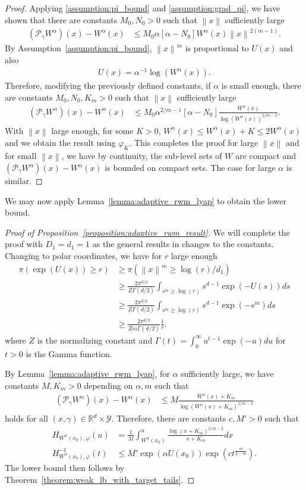 \documentclass[12pt]{article}
\theoremstyle{plain}
\theoremstyle{remark}
\newcommand{\norm}[1]{\left\lVert#1\right\rVert}
\newcommand{\R}{\mathbb{R}}
\renewcommand{\P}{\mathcal{P}}
\newcommand{\Y}{\mathcal{Y}}
\let\temp\phi
\let\phi\varphi
\let\varphi\temp
\newcommand{\eq}[1]{\begin{align*}#1\end{align*}}
\begin{document}
\begin{proof}
Applying \eqref{assumption:pi_bound} and \eqref{assumption:grad_pi}, we have shown that there are constants $M_0, N_0 > 0$ such that $\norm{x}$ sufficiently large
\begin{align*}
(\P_\gamma W^\alpha)(x) - W^\alpha(x)
&\le M_0 \alpha \left[ \alpha -  N_0 \right] W^\alpha(x) \norm{x}^{2(m-1)}.
\end{align*}
By Assumption~\ref{assumption:pi_bound}, $\norm{x}^m$ is proportional to $U(x)$ and also
\begin{align*}
U(x) = \alpha^{-1} \log(W^\alpha(x)).
\end{align*}
Therefore, modifying the previously defined constants, if $\alpha$ is small enough, there are constants $M_0, N_0, K_m > 0$ such that $\norm{x}$ sufficiently large
\begin{align*}
(\P_\gamma W^\alpha)(x) - W^\alpha(x)
&\le M_0 \alpha^{ 2/m - 1 } \left[ \alpha - N_0 \right] \frac{W^\alpha(x)}{ \log(W^\alpha(x))^{ 2/m - 2 } }.
\end{align*}
With $\norm{x}$ large enough, for some $K > 0$, $W^\alpha(x) \le W^\alpha(x) + K \le 2 W^\alpha(x)$ and we obtain the result using $\phi_K$.
This completes the proof for large $\norm{x}$ and for small $\norm{x}$, we have by continuity, the sub-level sets of $W$ are compact and $(\P_\gamma W^\alpha)(x) - W^\alpha(x)$ is bounded on compact sets.
The case for large $\alpha$ is similar.
\end{proof}

\noindent We may now apply Lemma~\ref{lemma:adaptive_rwm_lyap} to obtain the lower bound.

\begin{proof}[Proof of Proposition~\ref{proposition:adaptive_rwm_result}]
We will complete the proof with $D_1 = d_1 = 1$ as the general results in changes to the constants.
Changing to polar coordinates, we have for $r$ large enough
\eq{
\pi\left( \exp(U(x)) \ge r \right)
&\ge \pi\left( \norm{x}^m \ge \log(r) / d_1 \right)
\\
&\ge \frac{2 \pi^{d/2}}{Z \Gamma(d/2)} \int_{s^m \ge \log(r)} s^{d - 1} \exp(-U(s)) ds
\\
&\ge \frac{2 \pi^{d/2}}{Z \Gamma(d/2)} \int_{s^m \ge \log(r) } s^{d - 1} \exp(-s^m) ds
\\
&\ge \frac{2 \pi^{d/2}}{Z m \Gamma(d/2)} \frac{1}{r}.
}
where $Z$ is the normalizing constant and $\Gamma(t) = \int_0^\infty u^{t - 1} \exp(-u) du$ for $t > 0$ is the Gamma function.

By Lemma~\ref{lemma:adaptive_rwm_lyap}, for $\alpha$ sufficiently large, we have constants $M, K_m > 0$ depending on $\alpha, m$ such that
\eq{
(\P_\gamma W^\alpha)(x) - W^\alpha(x)
&\le M \frac{W^\alpha(x) + K_m}{ \log(W^\alpha(x) + K_m)^{ 2/m - 2 } }
}
holds for all $(x, \gamma) \in \R^d \times \Y$.
Therefore, there are constants $c, M' > 0$ such that
\eq{
H_{W^\alpha(x_0), \phi}(u) 
&= \frac{1}{M} \int_{W^\alpha(x_0)}^{u} \frac{ \log(x + K_m)^{2/m - 2} }{ x + K_m} dx
\\
H_{W^\alpha(x_0), \phi}^{-1}(t) 
&\le M' \exp(\alpha U(x_0)) \exp\left( c t^{\frac{m}{2-m}}\right).
}
The lower bound then follows by Theorem~\ref{theorem:weak_lb_with_target_tails}.
\end{proof}
\end{document}
